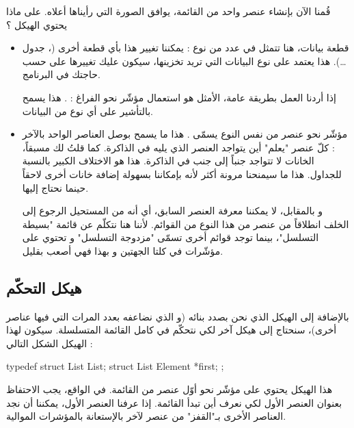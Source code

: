 قُمنا الآن بإنشاء عنصر واحد من القائمة، يوافق الصورة التي رأيناها أعلاه. على ماذا يحتوي الهيكل ؟

\begin{itemize}
	\item قطعة بيانات، هنا تتمثل في عدد من نوع 
	 :
	يمكننا تغيير هذا بأي قطعة أخرى
	(،
	جدول \dots). هذا يعتمد على نوع البيانات التي تريد تخزينها، سيكون عليك تغييرها على حسب حاجتك في البرنامج.
	
	\begin{information}
		إذا أردنا العمل بطريقة عامة، الأمثل هو استعمال مؤشّر نحو الفراغ :
		.
		هذا يسمح بالتأشير على أي نوع من البيانات.
	\end{information}
	\item مؤشّر نحو عنصر من نفس النوع يسمّى
	\InlineCode{next}.
	هذا ما يسمح بوصل العناصر الواحد بالآخر : كلّ عنصر "يعلم" أين يتواجد العنصر الذي يليه في الذاكرة. كما قلتُ لك مسبقاً، الخانات لا تتواجد جنباً إلى جنب في الذاكرة. هذا هو الاختلاف الكبير بالنسبة للجداول. هذا ما سيمنحنا مرونة أكثر لأنه بإمكاننا بسهولة إضافة خانات أخرى لاحقاً حينما نحتاج إليها.

\begin{information}
	و بالمقابل، لا يمكننا معرفة العنصر السابق، أي أنه من المستحيل الرجوع إلى الخلف انطلاقاً من عنصر من هذا النوع من القوائم. لأننا هنا نتكلّم عن قائمة "بسيطة التسلسل"، بينما توجد قوائم أخرى تسمّى "مزدوجة التسلسل" و تحتوي على مؤشّرات في كلتا الجهتين و بهذا فهي أصعب بقليل.
\end{information}
\end{itemize}


\subsection{هيكل التحكّم}

بالإضافة إلى الهيكل الذي نحن بصدد بنائه (و الذي نضاعفه بعدد المرات التي فيها عناصر أخرى)، سنحتاج إلى هيكل آخر لكي نتحكّم في كامل القائمة المتسلسلة. سيكون لهذا الهيكل الشكل التالي :

\begin{Csource}
typedef struct List List;
struct List
{
	Element *first;
};
\end{Csource}

هذا الهيكل
يحتوي على مؤشّر نحو أوّل عنصر من القائمة. في الواقع، يجب الاحتفاظ بعنوان العنصر الأول لكي نعرف أين تبدأ القائمة. إذا عرفنا العنصر الأول، يمكننا أن نجد العناصر الأخرى بـ"القفز" من عنصر لآخر بالإستعانة بالمؤشرات الموالية.

